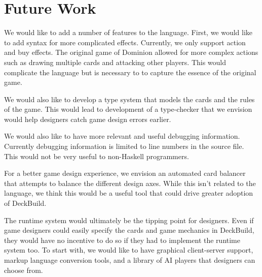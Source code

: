 
\section{Future Work}
\label{sec:future}

We would like to add a number of features to the language. First, we would like
to add syntax for more complicated effects. Currently, we only support action
and buy effects. The original game of Dominion allowed for more complex actions
such as drawing multiple cards and attacking other players. This would
complicate the language but is necessary to to capture the essence of the
original game.

We would also like to develop a type system that models the cards and the rules
of the game. This would lead to development of a type-checker that we envision
would help designers catch game design errors earlier.

We would also like to have more relevant and useful debugging information.
Currently debugging information is limited to line numbers in the source file.
This would not be very useful to non-Haskell programmers.

For a better game design experience, we envision an automated card balancer that
attempts to balance the different design axes. While this isn't related to the
language, we think this would be a useful tool that could drive greater adoption
of DeckBuild.

The runtime system would ultimately be the tipping point for designers. Even if
game designers could easily specify the cards and game mechanics in DeckBuild,
they would have no incentive to do so if they had to implement the runtime
system too. To start with, we would like to have graphical client-server
support, markup language conversion tools, and a library of AI players that
designers can choose from.
